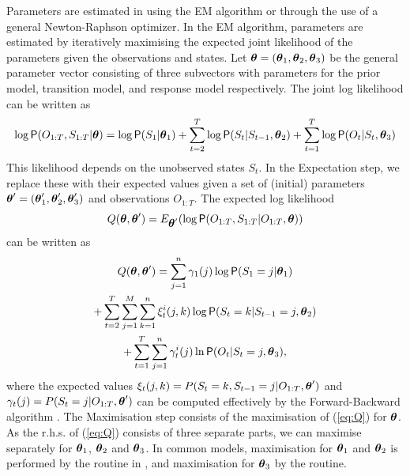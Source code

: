 \documentclass[article]{jss}
\newcommand{\greekv}[1]{\mbox{\boldmath$\mathrm{#1}$}}
\begin{document}
Parameters are estimated in  using the EM algorithm or
through the use of a general Newton-Raphson optimizer.  In the EM algorithm, 
parameters are estimated by iteratively maximising the 
expected joint likelihood of the parameters given the observations and states. 
Let $\greekv{\theta} = (\greekv{\theta}_1, \greekv{\theta}_2,\greekv{\theta}_3)$
be the general parameter vector consisting of three subvectors with parameters 
for the prior model, transition model, and response model respectively. The 
joint log likelihood can be written as
\begin{equation}
\log \Prob(O_{1:T}, S_{1:T}|\greekv{\theta}) = \log \Prob(S_1|\greekv{\theta}_1) 
+ \sum_{t=2}^{T} \log \Prob(S_t|S_{t-1},\greekv{\theta}_2) 
+ \sum_{t=1}^{T} \log \Prob(O_t|S_t,\greekv{\theta}_3)
\end{equation}
This likelihood depends on the unobserved states $S_t$. In the Expectation step,
we replace these with their expected values given a set of (initial) parameters 
$\greekv{\theta}' = (\greekv{\theta}'_1, \greekv{\theta}'_2,\greekv{\theta}'_3)$
and observations $O_{1:T}$. The expected log likelihood 
\begin{equation}
Q(\greekv{\theta},\greekv{\theta}') = E_{\greekv{\theta}'} 
(\log \Prob(O_{1:T},S_{1:T}|O_{1:T},\greekv{\theta}))
\end{equation}
can be written as
\begin{multline}
\label{eq:Q}
Q(\greekv{\theta},\greekv{\theta}') = 
\sum_{j=1}^n \gamma_1(j) \log \Prob(S_1=j|\greekv{\theta}_1) \\ 
+ \sum_{t=2}^T \sum_{j=1}^M \sum_{k=1}^n \xi_t^i(j,k) \log \Prob(S_t = k|S_{t-1} 
= j,\greekv{\theta}_2) \\ + \sum_{t=1}^T \sum_{j=1}^n \gamma_t^i(j) 
\ln \Prob(O_t|S_t=j,\greekv{\theta}_3),
\end{multline}
where the expected values $\xi_t(j,k) =  P(S_t = k, S_{t-1} = j|O_{1:T},\greekv{\theta}')$ and $\gamma_t(j) = P(S_t = j|O_{1:T},\greekv{\theta}')$ can be computed effectively by the Forward-Backward algorithm \citep[see e.g.,][]{Rabiner1989}. The Maximisation step consists of the maximisation of (\ref{eq:Q}) for $\greekv{\theta}$. As the r.h.s. of (\ref{eq:Q}) consists of three separate parts, we can maximise separately for $\greekv{\theta}_1$, $\greekv{\theta}_2$ and $\greekv{\theta}_3$. In common models, maximisation for $\greekv{\theta}_1$ and $\greekv{\theta}_2$ is performed by the  routine in , and maximisation for $\greekv{\theta}_3$ by the  routine. 
\end{document}
